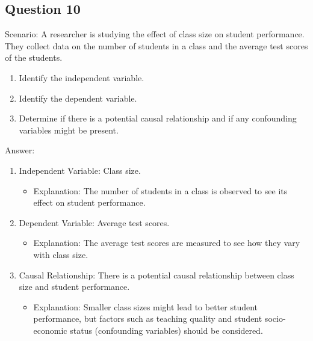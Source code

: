 \documentclass[
  letterpaper,
  DIV=11,
  numbers=noendperiod]{scrreprt}
\providecommand{\tightlist}{%
  \setlength{\itemsep}{0pt}\setlength{\parskip}{0pt}}\usepackage{longtable,booktabs,array}
\begin{document}
\subsection*{Question 10}\label{question-10}

Scenario: A researcher is studying the effect of class size on student
performance. They collect data on the number of students in a class and
the average test scores of the students.

\begin{enumerate}
\def\labelenumi{\arabic{enumi}.}
\tightlist
\item
  Identify the independent variable.
\item
  Identify the dependent variable.
\item
  Determine if there is a potential causal relationship and if any
  confounding variables might be present.
\end{enumerate}

Answer:

\begin{enumerate}
\def\labelenumi{\arabic{enumi}.}
\tightlist
\item
  Independent Variable: Class size.

  \begin{itemize}
  \tightlist
  \item
    Explanation: The number of students in a class is observed to see
    its effect on student performance.
  \end{itemize}
\item
  Dependent Variable: Average test scores.

  \begin{itemize}
  \tightlist
  \item
    Explanation: The average test scores are measured to see how they
    vary with class size.
  \end{itemize}
\item
  Causal Relationship: There is a potential causal relationship between
  class size and student performance.

  \begin{itemize}
  \tightlist
  \item
    Explanation: Smaller class sizes might lead to better student
    performance, but factors such as teaching quality and student
    socio-economic status (confounding variables) should be considered.
  \end{itemize}
\end{enumerate}
\end{document}
